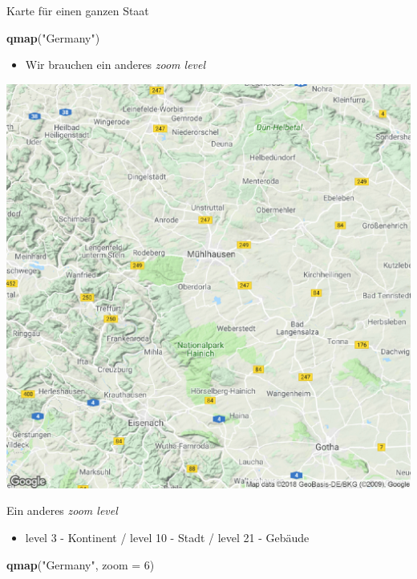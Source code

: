 \documentclass[ignorenonframetext,]{beamer}
\newenvironment{Shaded}{\begin{snugshade}}{\end{snugshade}}
\newcommand{\KeywordTok}[1]{\textcolor[rgb]{0.13,0.29,0.53}{\textbf{#1}}}
\newcommand{\DataTypeTok}[1]{\textcolor[rgb]{0.13,0.29,0.53}{#1}}
\newcommand{\DecValTok}[1]{\textcolor[rgb]{0.00,0.00,0.81}{#1}}
\newcommand{\StringTok}[1]{\textcolor[rgb]{0.31,0.60,0.02}{#1}}
\newcommand{\NormalTok}[1]{#1}
\providecommand{\tightlist}{%
  \setlength{\itemsep}{0pt}\setlength{\parskip}{0pt}}
\begin{document}
\begin{frame}[fragile]{Karte für einen ganzen Staat}

\begin{Shaded}
\begin{Highlighting}[]
\KeywordTok{qmap}\NormalTok{(}\StringTok{"Germany"}\NormalTok{)}
\end{Highlighting}
\end{Shaded}

\begin{itemize}
\tightlist
\item
  Wir brauchen ein anderes \emph{zoom level}
\end{itemize}

\includegraphics{figure/germany.pdf}

\end{frame}

\begin{frame}[fragile]{Ein anderes \emph{zoom level}}

\begin{itemize}
\tightlist
\item
  level 3 - Kontinent / level 10 - Stadt / level 21 - Gebäude
\end{itemize}

\begin{Shaded}
\begin{Highlighting}[]
\KeywordTok{qmap}\NormalTok{(}\StringTok{"Germany"}\NormalTok{, }\DataTypeTok{zoom =} \DecValTok{6}\NormalTok{)}
\end{Highlighting}
\end{Shaded}

\end{frame}
\end{document}
